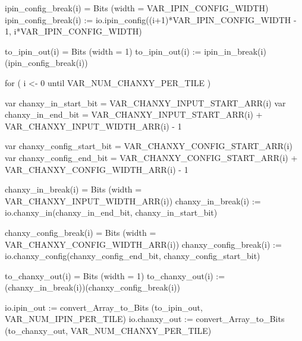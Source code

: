 \begin{scala}
{{    ipin_config_break(i) = Bits (width = VAR_IPIN_CONFIG_WIDTH)                                       
    ipin_config_break(i) := io.ipin_config((i+1)*VAR_IPIN_CONFIG_WIDTH - 1, i*VAR_IPIN_CONFIG_WIDTH)  
                                                                                                      
    to_ipin_out(i) = Bits (width = 1)                                                                 
    to_ipin_out(i) := ipin_in_break(i)(ipin_config_break(i))                                          
  }                                                                                                   
                                                                                                      
  for ( i <- 0 until VAR_NUM_CHANXY_PER_TILE )                                                        
  {                                                                                                   
    var chanxy_in_start_bit = VAR_CHANXY_INPUT_START_ARR(i)                                         
    var chanxy_in_end_bit = VAR_CHANXY_INPUT_START_ARR(i) + VAR_CHANXY_INPUT_WIDTH_ARR(i) - 1       
                                                                                                      
    var chanxy_config_start_bit = VAR_CHANXY_CONFIG_START_ARR(i)                                    
    var chanxy_config_end_bit = VAR_CHANXY_CONFIG_START_ARR(i) + VAR_CHANXY_CONFIG_WIDTH_ARR(i) - 1 
                                                                                                      
    chanxy_in_break(i) = Bits (width =  VAR_CHANXY_INPUT_WIDTH_ARR(i))                              
    chanxy_in_break(i) := io.chanxy_in(chanxy_in_end_bit, chanxy_in_start_bit)                      
                                                                                                      
    chanxy_config_break(i) = Bits (width = VAR_CHANXY_CONFIG_WIDTH_ARR(i))                          
    chanxy_config_break(i) := io.chanxy_config(chanxy_config_end_bit, chanxy_config_start_bit)      
                                                                                                      
    to_chanxy_out(i) = Bits (width = 1)                                                             
    to_chanxy_out(i) := (chanxy_in_break(i))(chanxy_config_break(i))                                
  }                                                                                                   
                                                                                                      
  io.ipin_out := convert_Array_to_Bits (to_ipin_out, VAR_NUM_IPIN_PER_TILE)                           
  io.chanxy_out := convert_Array_to_Bits (to_chanxy_out, VAR_NUM_CHANXY_PER_TILE)                     
}                                                                                                     
\end{scala}

